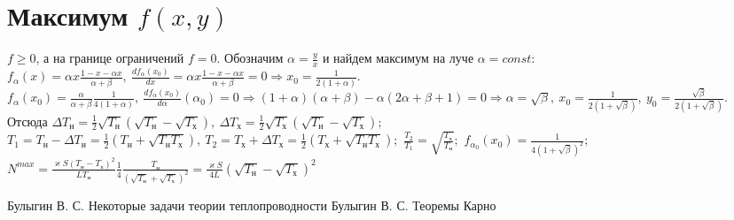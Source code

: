 \documentclass[a4paper]{article}
\begin{document}
\section{Максимум $f(x,y)$}
\label{maxsection}
$f\geq 0$, а на границе ограничений $f=0$. Обозначим $\alpha=\frac{y}{x}$ и найдем максимум на луче $\alpha=const$:\newline
$
f_\alpha(x)=\alpha x \frac{1-x-\alpha x}{\alpha + \beta},\ \frac{df_\alpha(x_0)}{dx}=\alpha x \frac{1-x-\alpha x}{\alpha + \beta}=0 \Longrightarrow x_0=\frac{1}{2(1+\alpha)}$.\newline
$f_\alpha(x_0)=\frac{\alpha}{\alpha + \beta}\frac{1}{4(1+\alpha)},\ 
\frac{df_\alpha(x_0)}{d\alpha}(\alpha_0)=0\Longrightarrow (1+\alpha)(\alpha+\beta)-\alpha(2\alpha+\beta+1)=0\Longrightarrow\alpha=\sqrt{\beta},\ 
x_0=\frac{1}{2(1+\sqrt{\beta})},\ y_0=\frac{\sqrt{\beta}}{2(1+\sqrt{\beta})}.$\newline
Отсюда\newline
$ %
\Delta T_{\text{н}}=\frac{1}{2}\sqrt{T_{\text{н}}}(\sqrt{T_{\text{н}}}-\sqrt{T_{\text{х}}}),\ 
\Delta T_{\text{х}}=\frac{1}{2}\sqrt{T_{\text{х}}}(\sqrt{T_{\text{н}}}-\sqrt{T_{\text{х}}});
$\newline 
$
T_1=T_{\text{н}}-\Delta T_{\text{н}}=\frac{1}{2}(T_{\text{н}}+\sqrt{T_{\text{н}}T_{\text{х}}}),\ 
T_2=T_{\text{х}}+\Delta T_{\text{х}}=\frac{1}{2}(T_{\text{х}}+\sqrt{T_{\text{н}}T_{\text{х}}});
$\newline
$\frac{T_2}{T_1}=\sqrt{\frac{T_{\text{х}}}{T_{\text{н}}}};$\newline
$f_{\alpha_0}(x_0)=\frac{1}{4(1+\sqrt{\beta})^2};$\newline
$N^{max}=\frac{\varkappa S(T_{\text{н}}-T_{\text{х}})^2}{LT_{\text{н}}}\frac{1}{4}\frac{T_{\text{н}}}{(\sqrt{T_{\text{н}}}+\sqrt{T_{\text{х}}})^2}=
\frac{\varkappa S}{4L}(\sqrt{T_{\text{н}}}-\sqrt{T_{\text{х}}})^2$

\begin{thebibliography}{0}
\bibitem{b1} Булыгин В. С. Некоторые задачи теории теплопроводности
\bibitem{b2} Булыгин В. С. Теоремы Карно
\end{thebibliography}
\end{document}
